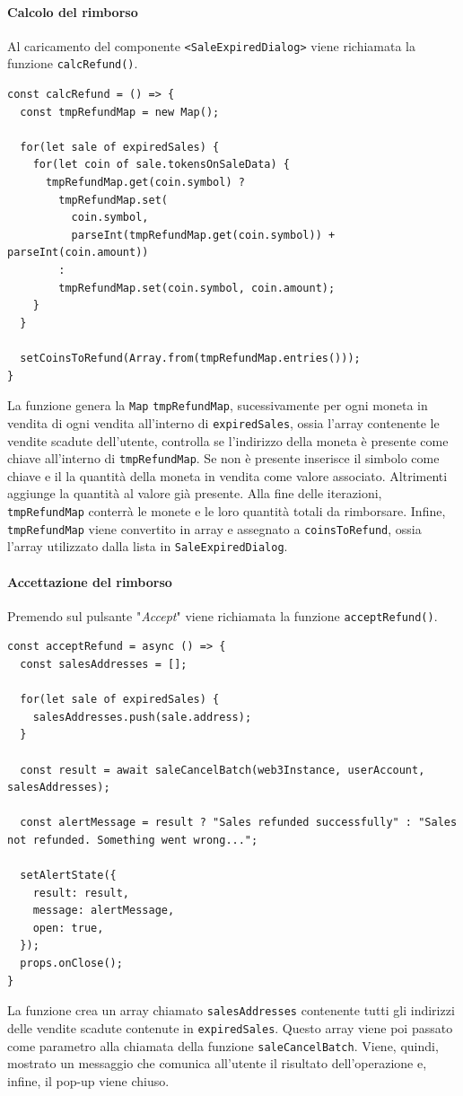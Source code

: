 \documentclass[a4paper]{article}
\begin{document}
        \paragraph{Calcolo del rimborso}
        Al caricamento del componente \verb|<SaleExpiredDialog>| viene richiamata la funzione \verb|calcRefund()|.
        \begin{lstlisting}[style=ES6, title={Funzione calcRefund()}]
const calcRefund = () => {
  const tmpRefundMap = new Map();

  for(let sale of expiredSales) {
    for(let coin of sale.tokensOnSaleData) {
      tmpRefundMap.get(coin.symbol) ?
        tmpRefundMap.set(
          coin.symbol,
          parseInt(tmpRefundMap.get(coin.symbol)) + parseInt(coin.amount))
        :
        tmpRefundMap.set(coin.symbol, coin.amount);
    }
  }

  setCoinsToRefund(Array.from(tmpRefundMap.entries()));
}\end{lstlisting}
        La funzione genera la \verb|Map| \verb|tmpRefundMap|, sucessivamente per ogni moneta in vendita di ogni vendita all'interno di \verb|expiredSales|, ossia l'array contenente le vendite scadute dell'utente, controlla se l'indirizzo della moneta è presente come chiave
        all'interno di \verb|tmpRefundMap|. Se non è presente inserisce il simbolo come chiave e il la quantità della moneta in vendita come valore associato. Altrimenti aggiunge la quantità al valore già presente.
        Alla fine delle iterazioni, \verb|tmpRefundMap| conterrà le monete e le loro quantità totali da rimborsare. Infine, \verb|tmpRefundMap| viene convertito in array e assegnato a \verb|coinsToRefund|, ossia l'array utilizzato dalla lista in \verb|SaleExpiredDialog|.
        \paragraph{Accettazione del rimborso}
        Premendo sul pulsante "\emph{Accept}" viene richiamata la funzione \verb|acceptRefund()|.
\begin{lstlisting}[style=ES6, title={Funzione acceptRefund()}]
const acceptRefund = async () => {
  const salesAddresses = [];

  for(let sale of expiredSales) {
    salesAddresses.push(sale.address);
  }

  const result = await saleCancelBatch(web3Instance, userAccount, salesAddresses);

  const alertMessage = result ? "Sales refunded successfully" : "Sales not refunded. Something went wrong...";

  setAlertState({
    result: result,
    message: alertMessage,
    open: true,
  });
  props.onClose();
}\end{lstlisting}
        La funzione crea un array chiamato \verb|salesAddresses| contenente tutti gli indirizzi delle vendite scadute contenute in \verb|expiredSales|. Questo array viene poi passato come parametro alla chiamata della funzione \verb|saleCancelBatch|.
        Viene, quindi, mostrato un messaggio che comunica all'utente il risultato dell'operazione e, infine, il pop-up viene chiuso.
\end{document}
